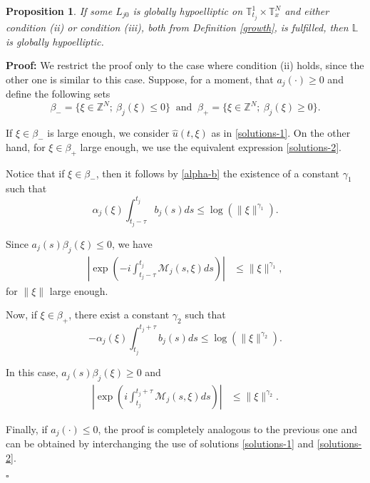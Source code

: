 \documentclass[12pt]{elsarticle}
\newtheorem{proposition}[theorem]{Proposition}
\numberwithin{equation}{section}
\newenvironment{proof}[1][\noindent \textbf{Proof: }]{#1}{ \hfill $\square$ \vspace{2mm}}
\begin{document}
\begin{proposition}\label{pro-super-log}
	If some $L_{j0}$ is globally hypoelliptic on $\mathbb{T}_{t_j}^1\times\mathbb{T}_x^N$ and  either condition (ii) or condition (iii), both from  Definition \ref{growth}, is fulfilled, then  $\mathbb{L}$ is globally hypoelliptic.
\end{proposition}

\begin{proof}
We restrict the proof only to the case where condition (ii) holds, since the other one is similar to this case. Suppose, for a moment, that  $a_j(\cdot) \geq 0$ and define the following sets
	$$
	\beta_- = \{\xi \in \mathbb{Z}^N; \ \beta_j(\xi) \leq 0\}
	\ \textrm{ and } \
	\beta_+ = \{\xi \in \mathbb{Z}^N; \ \beta_j(\xi) \geq 0\}.
	$$
	
	If $\xi \in \beta_-$ is large enough, we consider $\widehat{u}(t,\xi)$ as in 
	\eqref{solutions-1}. On the other hand, for  $\xi \in \beta_+$ large enough, we use the  equivalent expression \eqref{solutions-2}.
	
	Notice that if $\xi \in \beta_-$, then it follows by \eqref{alpha-b} the existence of a constant $\gamma_1$  such that
	\begin{equation}\label{alpha-b-super-1}
	\alpha_j(\xi) \int_{t_j - \tau}^{t_j}b_j(s) ds \leq \log(\|\xi\|^{\gamma_1}).
	\end{equation}
	
	Since  $a_j(s)\beta_j(\xi) \leq 0$, we have
	\begin{align*}
	\left |
	\exp \left(-i\int_{t_j-\tau}^{t_j}\mathcal{M}_j(s,\xi)ds \right) 
	\right| 
	& \leq \|\xi\|^{\gamma_1},
	\end{align*}
	for $\|\xi\|$ large enough.
	
	Now, if $\xi \in \beta_+$, there exist a constant $\gamma_2$  such that 
	\begin{equation}\label{alpha-b-super-1}
	-\alpha_j(\xi) \int_{t_j}^{t_j+ \tau}b_j(s) ds \leq 
	\log(\|\xi\|^{\gamma_2}).
	\end{equation}
	
	In this case, $a_j(s)\beta_j(\xi) \geq 0$ and 
	\begin{align*}
	\left |
	\exp \left(i\int_{t_j}^{t_j+ \tau }\mathcal{M}_j(s,\xi)ds \right) 
	\right| 
	& \leq \|\xi\|^{\gamma_2}.
	\end{align*}
	
	
Finally, if $a_j(\cdot)\leq 0$,  the proof is completely analogous to the previous one   and can be obtained by interchanging the use of  solutions \eqref{solutions-1} and \eqref{solutions-2}.
	

	
\end{proof}
\end{document}
